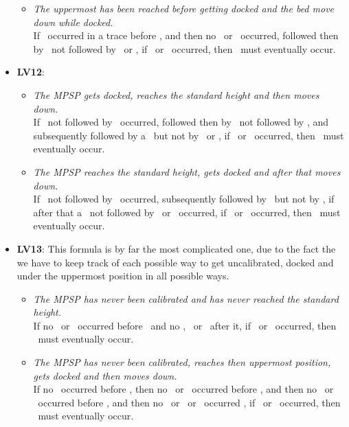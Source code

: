 \begin{itemize}
\begin{itemize}
        \item \textit{The uppermost has been reached before getting docked and the bed move down while docked.}\\
        If \uppermostReached\ occurred in a trace before \motorDown, and then no \uppermostReached\ or \emergencyMode\ occurred, followed then by \undock\  not followed by \dock\ or \uppermostReached, if \pressUp\ or \pressDown\ occurred, then \motorUp\ must eventually occur.
    \end{itemize}

    \item \textbf{LV12}:
    \begin{itemize}
        \item \textit{The MPSP gets docked, reaches the standard height and then moves down.\\}
        If \dock\ not followed by \undock\ occurred, followed then by \standardHeightReached\ not followed by \undock, and subsequently followed by a \motorDown\  but not by \standardHeightReached\ or \undock, if \pressUp\ or \pressDown\ occurred, then \motorUp\ must eventually occur.

        \item \textit{The MPSP reaches the standard height, gets docked and after that moves down.\\}
        If \standardHeightReached\ not followed by \resetStandardHeight\ occurred, subsequently followed by \dock\ but not by \undock, if after that a \motorDown\ not followed by \standardHeightReached\ or \undock\ occurred, if \pressUp\ or \pressDown\ occurred, then \motorUp\ must eventually occur.
    \end{itemize}

    \item \textbf{LV13}:
    This formula is by far the most complicated one, due to the fact the we have to keep track of each possible way to get uncalibrated, docked and under the uppermost position in all possible ways.

    \begin{itemize}
        \item \textit{The MPSP has never been calibrated and has never reached the standard height.}\\
        If no \setStandardHeight\ or \uppermostReached\ occurred before \dock\ and no \setStandardHeight, \undock\ or \uppermostReached\ after it, if \pressUp\ or \pressDown\ occurred, then \motorUp\ must eventually occur.

        \item \textit{The MPSP has never been calibrated, reaches then uppermost position, gets docked and then moves down.}\\
        If no \setStandardHeight\ occurred before \uppermostReached, then no \motorDown\ or \setStandardHeight\ occurred before \dock, and then no \undock\ or \setStandardHeight\ occurred before \motorDown, and then no \undock\ or \setStandardHeight\ or \uppermostReached\ occurred , if \pressUp\ or \pressDown\ occurred, then \motorUp\ must eventually occur.


\end{itemize}
\end{itemize}
